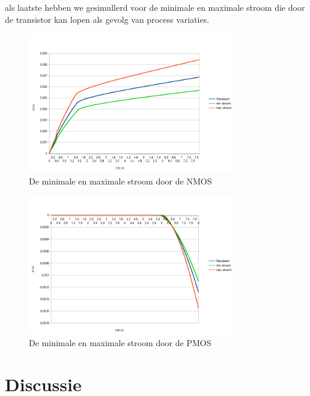 \documentclass{article}
\begin{document}
als laatste hebben we gesimullerd voor de minimale en maximale stroom die door de transistor kan lopen als gevolg van process variaties.

\begin{figure}[H]
	\centering
	\includegraphics[width=0.8\textwidth]{nmosminmax}
	\caption{De minimale en maximale stroom door de NMOS}
\end{figure}

\begin{figure}[H]
	\centering
	\includegraphics[width=0.8\textwidth]{pmosminmax}
	\caption{De minimale en maximale stroom door de PMOS}
\end{figure}

\section{Discussie}
\end{document}
